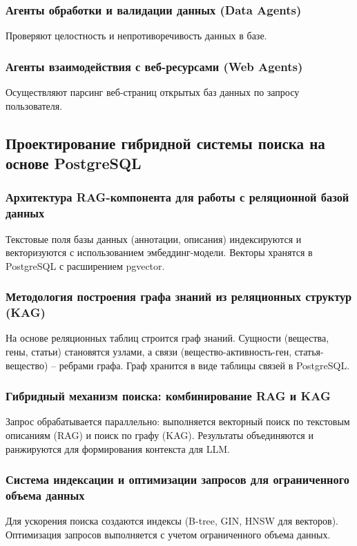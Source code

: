 \documentclass[a4paper,14pt]{extarticle}
\begin{document}
	\subsubsection{Агенты обработки и валидации данных (Data Agents)}
	Проверяют целостность и непротиворечивость данных в базе.
	
	\subsubsection{Агенты взаимодействия с веб-ресурсами (Web Agents)}
	Осуществляют парсинг веб-страниц открытых баз данных по запросу пользователя.
	
	\subsection{Проектирование гибридной системы поиска на основе PostgreSQL}
	
	\subsubsection{Архитектура RAG-компонента для работы с реляционной базой данных}
	Текстовые поля базы данных (аннотации, описания) индексируются и векторизуются с использованием эмбеддинг-модели. Векторы хранятся в PostgreSQL с расширением pgvector.
	
	\subsubsection{Методология построения графа знаний из реляционных структур (KAG)}
	На основе реляционных таблиц строится граф знаний. Сущности (вещества, гены, статьи) становятся узлами, а связи (вещество-активность-ген, статья-вещество) – ребрами графа. Граф хранится в виде таблицы связей в PostgreSQL.
	
	\subsubsection{Гибридный механизм поиска: комбинирование RAG и KAG}
	Запрос обрабатывается параллельно: выполняется векторный поиск по текстовым описаниям (RAG) и поиск по графу (KAG). Результаты объединяются и ранжируются для формирования контекста для LLM.
	
	\subsubsection{Система индексации и оптимизации запросов для ограниченного объема данных}
	Для ускорения поиска создаются индексы (B-tree, GIN, HNSW для векторов). Оптимизация запросов выполняется с учетом ограниченного объема данных.
	
\end{document}
